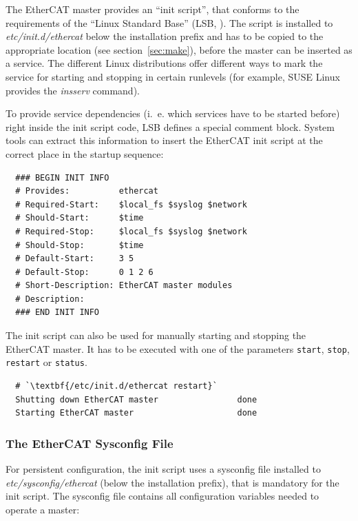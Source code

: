 \documentclass[a4paper,12pt,BCOR6mm,bibtotoc,idxtotoc]{scrbook}
\begin{document}
The EtherCAT master provides an ``init script'', that conforms to the
requirements of the ``Linux Standard Base'' (LSB,
\cite{lsb}). The script is installed to \textit{etc/init.d/ethercat}
below the installation prefix and has to be copied to the appropriate
location (see section~\ref{sec:make}), before the master can be
inserted as a service. The different Linux distributions offer
different ways to mark the service for starting and stopping in
certain runlevels (for example, SUSE Linux provides the
\textit{insserv} command).

To provide service dependencies (i.~e. which services have to be
started before) right inside the init script code, LSB defines a
special comment block. System tools can extract this information to
insert the EtherCAT init script at the correct place in the startup
sequence:

\begin{lstlisting}
  ### BEGIN INIT INFO
  # Provides:          ethercat
  # Required-Start:    $local_fs $syslog $network
  # Should-Start:      $time
  # Required-Stop:     $local_fs $syslog $network
  # Should-Stop:       $time
  # Default-Start:     3 5
  # Default-Stop:      0 1 2 6
  # Short-Description: EtherCAT master modules
  # Description:
  ### END INIT INFO
\end{lstlisting}

The init script can also be used for manually starting and stopping
the EtherCAT master. It has to be executed with one of the parameters
\texttt{start}, \texttt{stop}, \texttt{restart} or \texttt{status}.

\begin{lstlisting}
  # `\textbf{/etc/init.d/ethercat restart}`
  Shutting down EtherCAT master                done
  Starting EtherCAT master                     done
\end{lstlisting}

\subsubsection{The EtherCAT Sysconfig File}
\label{sec:sysconfig}

For persistent configuration, the init script uses a sysconfig file
installed to \textit{etc/sysconfig/ethercat} (below the installation
prefix), that is mandatory for the init script. The sysconfig file
contains all configuration variables needed to operate a master:
\end{document}
